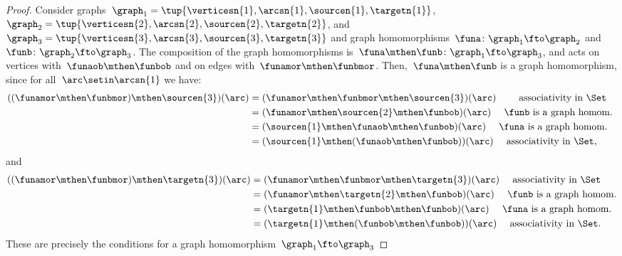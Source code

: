 \begin{proof}
    Consider graphs~$\graph_1=\tup{\verticesn{1},\arcsn{1},\sourcen{1},\targetn{1}}$,~$\graph_2=\tup{\verticesn{2},\arcsn{2},\sourcen{2},\targetn{2}}$, and~$\graph_3=\tup{\verticesn{3},\arcsn{3},\sourcen{3},\targetn{3}}$ and
    graph homomorphisms~$\funa \colon \graph_1 \fto \graph_2$ and~$\funb \colon \graph_2 \fto \graph_3$.
    The composition of the graph homomorphisms is~$\funa\mthen \funb \colon \graph_1 \fto \graph_3$, and acts on vertices with~$\funaob \mthen \funbob$ and on edges with~$\funamor \mthen \funbmor$.
    Then,~$\funa\mthen \funb$ is a graph homomorphism, since for all~$\arc \setin \arcsn{1}$ we have:
    \begin{equation}
        \begin{aligned}
            ((\funamor\mthen \funbmor) \mthen \sourcen{3})(\arc) & =(\funamor\mthen \funbmor \mthen \sourcen{3})(\arc) \qquad \text{ associativity in \Set} \\
                                                                 & =(\funamor\mthen \sourcen{2} \mthen \funbob)(\arc) \quad \text{ $\funb$ is a graph homom.
            } \\
                                                                 & =(\sourcen{1} \mthen \funaob\mthen \funbob)(\arc) \quad \text{ $\funa$ is a graph homom.} \\
                                                                 & =(\sourcen{1} \mthen (\funaob\mthen \funbob))(\arc) \quad \text{ associativity in \Set},
        \end{aligned}
    \end{equation}
    and
    \begin{equation}
        \begin{aligned}
            ((\funamor \mthen \funbmor) \mthen \targetn{3})(\arc) & =(\funamor \mthen \funbmor \mthen \targetn{3})(\arc) \quad \text{ associativity in \Set} \\
                                                                  & =(\funamor \mthen \targetn{2}\mthen \funbob)(\arc) \quad \text{ $\funb$ is a graph homom.} \\
                                                                  & =(\targetn{1} \mthen \funbob\mthen \funbob)(\arc)\quad \text{ $\funa$ is a graph homom.} \\
                                                                  & =(\targetn{1} \mthen (\funbob\mthen \funbob))(\arc)\quad \text{ associativity in \Set}.
        \end{aligned}
    \end{equation}
    These are precisely the conditions for a graph homomorphism~$\graph_1 \fto \graph_3$
\end{proof}
